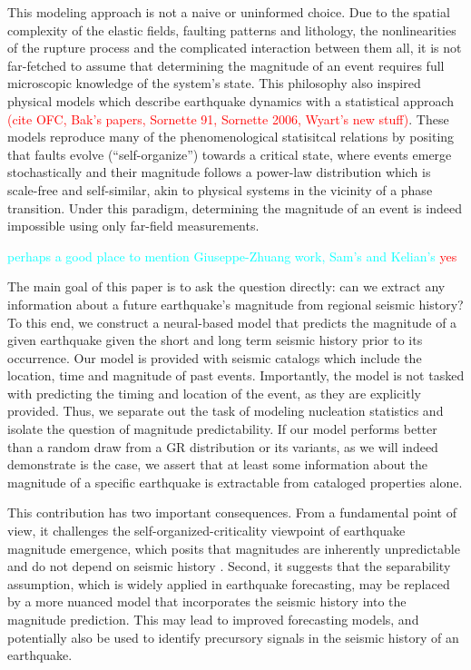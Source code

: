 \documentclass[pdflatex]{sn-jnl}
\newcommand{\yohai}[1]{{\textcolor{red}{#1}}}
\newcommand{\neri}[1]{{\textcolor{cyan}{#1}}}
\begin{document}
This modeling approach is not a naive or uninformed choice. Due to the spatial complexity of the elastic fields, faulting patterns and lithology, the nonlinearities of the rupture process and the complicated interaction between them all, it is not far-fetched to assume that determining the magnitude of an event  requires full microscopic knowledge of the system's state. 
This philosophy also inspired physical models which describe earthquake dynamics with a statistical approach \yohai{(cite OFC, Bak's papers, Sornette 91, Sornette 2006, Wyart's new stuff)}. These models reproduce many of the phenomenological  statisitcal relations by positing that faults evolve (``self-organize'') towards a critical state, where events emerge stochastically and their magnitude follows a power-law distribution which is scale-free and self-similar, akin to physical systems in the vicinity of a phase transition. Under this paradigm, determining the magnitude of an event is indeed impossible using only far-field measurements. 

\neri{perhaps a good place to mention Giuseppe-Zhuang work, Sam's  and Kelian's} \yohai{yes}

The main goal of this paper is to ask the question directly: can we extract any information about a future earthquake's magnitude from regional seismic history? To this end, we construct a neural-based model that predicts the magnitude of a given earthquake given the short and long term seismic history prior to its occurrence. Our model is provided with seismic catalogs which include the location, time and magnitude of past events. Importantly, the model is not tasked with predicting the timing and location of the event, as they are explicitly provided. Thus, we separate out the task of modeling nucleation statistics and isolate the question of magnitude predictability. If our model performs better than a random draw from a GR distribution or its variants, as we will indeed demonstrate is the case, we assert that at least some information about the magnitude of a specific earthquake is extractable from cataloged properties alone. 

This contribution has two important consequences. From a fundamental point of view, it challenges the self-organized-criticality viewpoint of earthquake magnitude emergence, which posits that magnitudes are inherently unpredictable and do not depend on seismic history \cite{olami_self-organized_1992, sornette_self-organized_1989, bak_earthquakes_1989, de_geus_scaling_2022}. Second, it suggests that the separability assumption, which is widely applied in earthquake forecasting, may be replaced by a more nuanced model that incorporates the seismic history into the magnitude prediction. This may lead to improved forecasting models, and potentially also be used to identify precursory signals in the seismic history of an earthquake.
\end{document}
